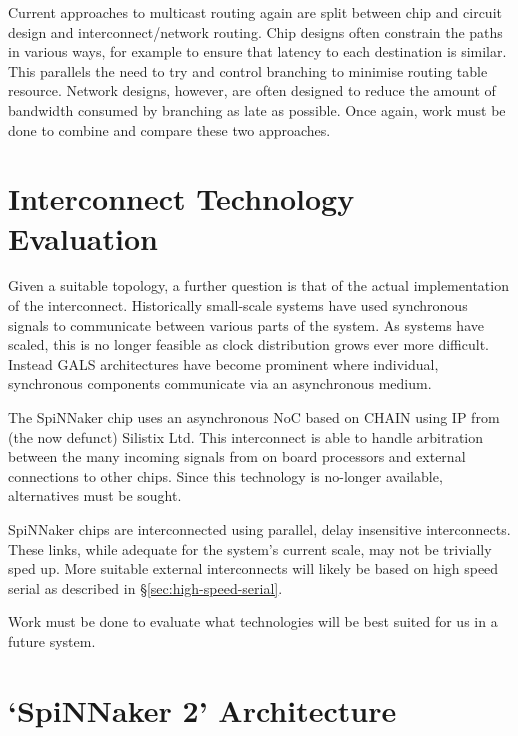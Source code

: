 		Current approaches to multicast routing again are split between chip and
		circuit design and interconnect/network routing. Chip designs often
		constrain the paths in various ways, for example to ensure that latency to
		each destination is similar. This parallels the need to try and control
		branching to minimise routing table resource. Network designs, however, are
		often designed to reduce the amount of bandwidth consumed by branching as
		late as possible. Once again, work must be done to combine and compare these
		two approaches.
	
	\section{Interconnect Technology Evaluation}
		
		
		Given a suitable topology, a further question is that of the actual
		implementation of the interconnect. Historically small-scale systems have
		used synchronous signals to communicate between various parts of the system.
		As systems have scaled, this is no longer feasible as clock distribution
		grows ever more difficult. Instead GALS architectures have become prominent
		where individual, synchronous components communicate via an asynchronous
		medium.
		
		The SpiNNaker chip uses an asynchronous NoC based on CHAIN
		\cite{plana07,bainbridge02} using IP from (the now defunct) Silistix Ltd.
		This interconnect is able to handle arbitration between the many incoming
		signals from on board processors and external connections to other chips.
		Since this technology is no-longer available, alternatives must be sought.
		
		SpiNNaker chips are interconnected using parallel, delay insensitive
		interconnects. These links, while adequate for the system's current scale,
		may not be trivially sped up. More suitable external interconnects will
		likely be based on high speed serial as described in
		\S\ref{sec:high-speed-serial}.
		
		Work must be done to evaluate what technologies will be best suited for us
		in a future system.
	
	\section{`SpiNNaker 2' Architecture}
		
